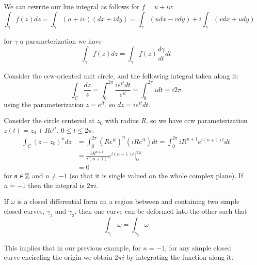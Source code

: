 \documentclass[12pt, a4paper, oneside, openright, titlepage]{book}
\begin{document}
\begin{defn}
    We can rewrite our line integral as follows for $f = u+iv$: \begin{equation*}
        \int_{\gamma}f(z)dz = \int_{\gamma}(u+iv)(dx+idy) = \int_{\gamma}(udx-vdy)+i\int_{\gamma}(vdx+udy)
    \end{equation*}
\end{defn}

for $\gamma$ a parameterization we have \begin{equation*}
    \int_{\gamma}f(z)dz = \int_{\gamma}f(z)\frac{d\gamma}{dt}dt
\end{equation*}

\begin{eg}
    Consider the ccw-oriented unit circle, and the following integral taken along it: \begin{equation*}
        \int_{C}\frac{dz}{z} = \int_{0}^{2\pi}\frac{ie^{it}dt}{e^{it}} = \int_{0}^{2\pi}idt = i2\pi
    \end{equation*}
    using the parameterization $z = e^{it}$, so $dz = ie^{it}dt$.
\end{eg}

\begin{eg}
    Consider the circle centered at $z_0$ with radius $R$, so we have ccw parameterization $z(t) = z_0 + Re^{it}$, $0 \leq t \leq 2\pi$: \begin{align*}
        \int_C(z-z_0)^ndz &= \int_{0}^{2\pi}(Re^{it})^n(iRe^{it})dt = \int_{0}^{2\pi}iR^{n+1}e^{i(n+1)t}dt \\
        &= \frac{iR^{n+1}}{i(n+1)}e^{i(n+1)t}\Bigg\rvert_0^{2\pi} \\
        &= 0
    \end{align*}
    for $n \in \mathbb Z$ and $n \neq -1$ (so that it is single valued on the whole complex plane). If $n = -1$ then the integral is $2\pi i$. 
\end{eg}


\begin{rec}
    If $\omega$ is a closed differential form an a region between and containing two simple closed curves, $\gamma_1$ and $\gamma_2$, then one curve can be deformed into the other such that \begin{equation*}
        \int_{\gamma_1}\omega = \int_{\gamma_2}\omega
    \end{equation*}
\end{rec}
This implies that in our previous example, for $n = -1$, for any simple closed curve encircling the origin we obtain $2\pi i$ by integrating the function along it.
\end{document}

